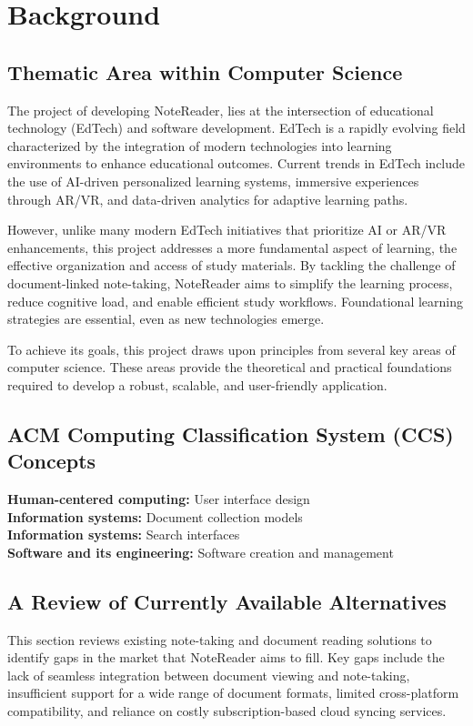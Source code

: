 \chapter{Background}
\label{chap:background}

\section{Thematic Area within Computer Science}

The project of developing NoteReader, lies at the intersection of educational technology (EdTech) and software development. EdTech is a rapidly evolving field characterized by the integration of modern technologies into learning environments to enhance educational outcomes. Current trends in EdTech include the use of AI-driven personalized learning systems, immersive experiences through AR/VR, and data-driven analytics for adaptive learning paths.

However, unlike many modern EdTech initiatives that prioritize AI or AR/VR enhancements, this project addresses a more fundamental aspect of learning, the effective organization and access of study materials. By tackling the challenge of document-linked note-taking, NoteReader aims to simplify the learning process, reduce cognitive load, and enable efficient study workflows. Foundational learning strategies are essential, even as new technologies emerge.

To achieve its goals, this project draws upon principles from several key areas of computer science. These areas provide the theoretical and practical foundations required to develop a robust, scalable, and user-friendly application.

\section*{ACM Computing Classification System (CCS) Concepts}

\noindent
\textbf{Human-centered computing:} User interface design\\
\textbf{Information systems:} Document collection models\\
\textbf{Information systems:} Search interfaces\\
\textbf{Software and its engineering:} Software creation and management


 \section{A Review of Currently Available Alternatives}
This section reviews existing note-taking and document reading solutions to identify gaps in the market that NoteReader aims to fill. Key gaps include the lack of seamless integration between document viewing and note-taking, insufficient support for a wide range of document formats, limited cross-platform compatibility, and reliance on costly subscription-based cloud syncing services. 

